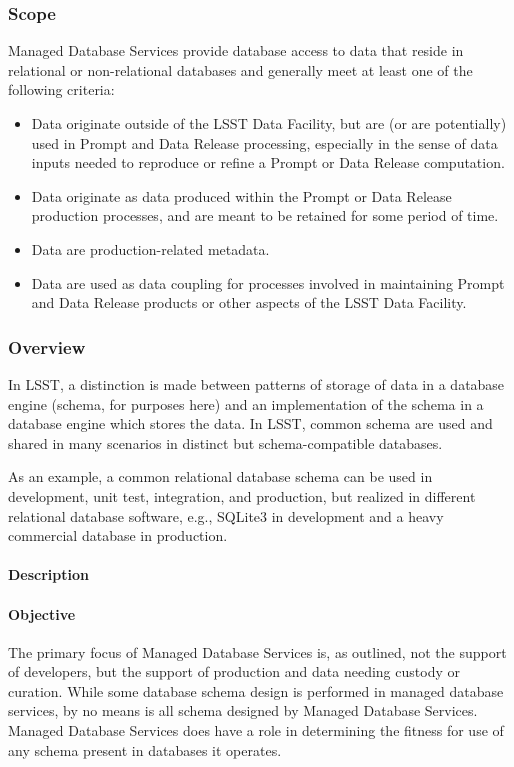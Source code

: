 \subsubsection{Scope}

Managed Database Services provide database access to data that reside in relational or non-relational databases
and generally meet at least one of the following criteria:
\begin{itemize}
\item Data originate outside of the LSST Data Facility, but are (or are potentially) used in Prompt and Data Release processing,
especially in the sense of data inputs needed to reproduce or refine a Prompt or Data Release computation.
\item Data originate as data produced within the Prompt  or Data Release production processes, and are meant to be retained for some period of time.
\item Data are production-related metadata.
\item Data are used as data coupling for processes involved in maintaining Prompt  and Data Release  products or other aspects of the LSST Data Facility.
\end{itemize}

\subsubsection{Overview}

In LSST, a distinction is made between patterns of storage of
data in a database engine (schema, for purposes here) and an
implementation of the schema in a database engine which stores the
data. In LSST, common schema are used and shared in many scenarios in
distinct but schema-compatible databases.

As an example, a common relational database schema can be used in
development, unit test, integration, and production, but realized in
different relational database software, e.g., SQLite3 in development
and a heavy commercial database in production.

\paragraph{Description}

\paragraph{Objective}

The primary focus of Managed Database Services is, as outlined, not the support
of developers, but the support of production and data needing custody or curation.
While some database schema design is performed in managed database services,
by no means is all schema designed by Managed Database Services. Managed Database
Services does have a role in determining the fitness for use of any schema present in
databases it operates.

